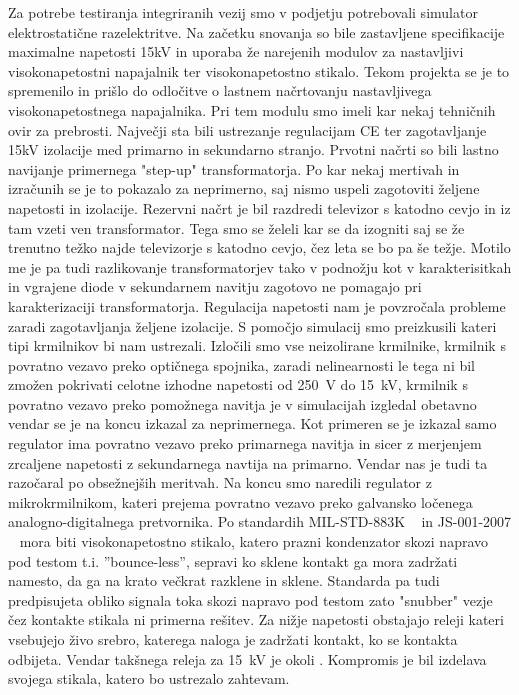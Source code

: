 \documentclass[a4paper,twoside,openright,12pt,slovene]{book}
\begin{document}
Za potrebe testiranja integriranih vezij smo v podjetju potrebovali simulator elektrostatične razelektritve. Na začetku snovanja so bile zastavljene specifikacije maximalne napetosti 15kV in uporaba že narejenih modulov za nastavljivi visokonapetostni napajalnik ter visokonapetostno stikalo. Tekom projekta se je to spremenilo in prišlo do odločitve o lastnem načrtovanju nastavljivega visokonapetostnega napajalnika. Pri tem modulu smo imeli kar nekaj tehničnih ovir za prebrosti. Največji sta bili ustrezanje regulacijam CE ter zagotavljanje 15kV izolacije med primarno in sekundarno stranjo.
Prvotni načrti so bili lastno navijanje primernega "step-up" transformatorja. Po kar nekaj mertivah in izračunih se je to pokazalo za neprimerno, saj nismo uspeli zagotoviti željene napetosti in izolacije. Rezervni načrt je bil razdredi televizor s katodno cevjo in iz tam vzeti ven transformator. Tega smo se želeli kar se da izogniti saj se že trenutno težko najde televizorje s katodno cevjo, čez leta se bo pa še težje. Motilo me je pa tudi razlikovanje transformatorjev tako v podnožju kot v karakterisitkah in vgrajene diode v sekundarnem navitju zagotovo ne pomagajo pri karakterizaciji transformatorja. 
Regulacija napetosti nam je povzročala probleme zaradi zagotavljanja željene izolacije. S pomočjo simulacij smo preizkusili kateri tipi krmilnikov bi nam ustrezali. Izločili smo vse neizolirane krmilnike, krmilnik s povratno vezavo preko optičnega spojnika, zaradi nelinearnosti le tega ni bil zmožen pokrivati celotne izhodne napetosti od \SI{250}{\volt} do \SI{15}{\kilo\volt}, krmilnik s povratno vezavo preko pomožnega navitja je v simulacijah izgledal obetavno vendar se je na koncu izkazal za neprimernega. Kot primeren se je izkazal samo regulator ima povratno vezavo preko primarnega navitja in sicer z merjenjem zrcaljene napetosti z sekundarnega navtija na primarno. Vendar nas je tudi ta razočaral po obsežnejših meritvah. Na koncu smo naredili regulator z mikrokrmilnikom, kateri prejema povratno vezavo preko galvansko ločenega analogno-digitalnega pretvornika.
Po standardih MIL-STD-883K ~\cite{MIL-STD-883K} in JS-001-2007 ~\cite{JS-001-2017} mora biti visokonapetostno stikalo, katero prazni kondenzator skozi napravo pod testom t.i. ''bounce-less'', sepravi ko sklene kontakt ga mora zadržati namesto, da ga na krato večkrat razklene in sklene. Standarda pa tudi predpisujeta obliko signala toka skozi napravo pod testom zato "snubber" vezje čez kontakte stikala ni primerna rešitev. Za nižje napetosti obstajajo releji kateri vsebujejo živo srebro, katerega naloga je zadržati kontakt, ko se kontakta odbijeta. Vendar takšnega releja za \SI{15}{\kilo\volt} je okoli .
Kompromis je bil izdelava svojega stikala, katero bo ustrezalo zahtevam.
\end{document}

